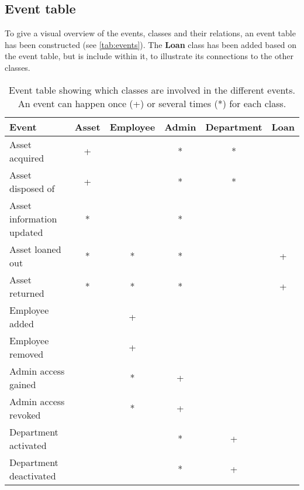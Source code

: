 \subsection{Event table}\label{ssc:eventtable}
To give a visual overview of the events, classes and their relations, an event table has been constructed (see \autoref{tab:events}). The \textbf{Loan} class has been added based on the event table, but is include within it, to illustrate its connections to the other classes.
\par



\begin{table}[H]
\centering
    \begin{tabular}{|l||c|c|c|c||c|}
        \hline
        \textbf{Event} & \textbf{Asset} & \textbf{Employee} & \textbf{Admin} & \textbf{Department} & \hfil\textbf{Loan \newline \hfil}\\
        \hline
        \hline
        Asset acquired & + & & * & * & \\
        \hline
        Asset disposed of & + & & * & * & \\
        \hline
        Asset information updated & * & & * & & \\
        \hline
        Asset loaned out & * & * & * & & + \\
        \hline
        Asset returned & * & * & * & & + \\
        \hline
        Employee added & & + & & & \\
        \hline
        Employee removed & & + & & & \\
        \hline
        Admin access gained & & * & + & & \\
        \hline
        Admin access revoked & & * & + & & \\
        \hline
        Department activated & & & * & + & \\
        \hline
        Department deactivated & & & * & + & \\
        \hline
    \end{tabular}
\caption{Event table showing which classes are involved in the different events. An event can happen once (+) or several times (*) for each class.}\label{tab:events}
\end{table}

